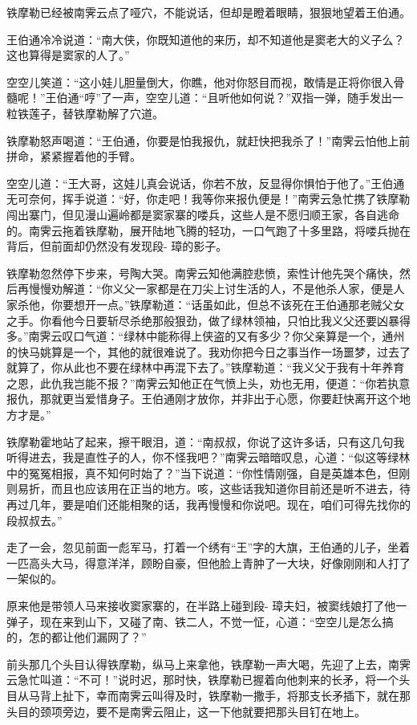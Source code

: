 \documentclass[12pt,oneside]{book}
\begin{document}
铁摩勒已经被南霁云点了哑穴，不能说话，但却是瞪着眼睛，狠狠地望着王伯通。

王伯通冷冷说道：``南大侠，你既知道他的来历，却不知道他是窦老大的义子么？这也算得是窦家的人了。''

空空儿笑道：``这小娃儿胆量倒大，你瞧，他对你怒目而视，敢情是正将你很入骨髓呢！''王伯通``哼''了一声，空空儿道：``且听他如何说？''双指一弹，随手发出一粒铁莲子，替铁摩勒解了穴道。

铁摩勒怒声喝道：``王伯通，你要是怕我报仇，就赶快把我杀了！''南霁云怕他上前拼命，紧紧握着他的手臂。

空空儿道：``王大哥，这娃儿真会说话，你若不放，反显得你惧怕于他了。''王伯通无可奈何，挥手说道：``好，你走吧！我等你来报仇便是！''南霁云急忙携了铁摩勒闯出寨门，但见漫山遍岭都是窦家寨的喽兵，这些人是不愿归顺王家，各自逃命的。南霁云拖着铁摩勒，展开陆地飞腾的轻功，一口气跑了十多里路，将喽兵抛在背后，但前面却仍然没有发现段-
璋的影子。

铁摩勒忽然停下步来，号陶大哭。南霁云知他满腔悲愤，索性计他先哭个痛快，然后再慢慢劝解道：``你义父一家都是在刀尖上讨生活的人，不是他杀人家，便是人家杀他，你要想开一点。''铁摩勒道：``话虽如此，但总不该死在王伯通那老贼父女之手。你看他今日要斩尽杀绝那般狠劲，做了绿林领袖，只怕比我义父还要凶暴得多。''南霁云叹口气道：``绿林中能称得上侠盗的又有多少？你父亲算是一个，通州的快马姚算是一个，其他的就很难说了。我劝你把今日之事当作一场噩梦，过去了就算了，你从此也不要在绿林中再混下去了。''铁摩勒道：``我义父于我有十年养育之恩，此仇我岂能不报？''南霁云知他正在气愤上头，劝也无用，便道：``你若执意报仇，那就更当爱惜身子。王伯通刚才放你，并非出于心愿，你要赶快离开这个地方才是。''

铁摩勒霍地站了起来，擦干眼泪，道：``南叔叔，你说了这许多话，只有这几句我听得进去，我是直性子的人，你不怪我吧？''南霁云暗暗叹息，心道：``似这等绿林中的冤冤相报，真不知何时始了？''当下说道：``你性情刚强，自是英雄本色，但刚则易折，而且也应该用在正当的地方。咳，这些话我知道你目前还是听不进去，待再过几年，要是咱们还能相聚的话，我再慢慢和你说吧。现在，咱们可得先找你的段叔叔去。''

走了一会，忽见前面一彪军马，打着一个绣有``王''字的大旗，王伯通的儿子，坐着一匹高头大马，得意洋洋，顾盼自豪，但他脸上青肿了一大块，好像刚刚和人打了一架似的。

原来他是带领人马来接收窦家寨的，在半路上碰到段-
璋夫妇，被窦线娘打了他一弹子，现在来到山下，又碰了南、铁二人，不觉一怔，心道：``空空儿是怎么搞的，怎的都让他们漏网了？''

前头那几个头目认得铁摩勒，纵马上来拿他，铁摩勒一声大喝，先迎了上去，南霁云急忙叫道：``不可！''说时迟，那时快，铁摩勒已握着向他刺来的长矛，将一个头目从马背上扯下，幸而南霁云叫得及时，铁摩勒一撒手，将那支长矛插下，就在那头目的颈项旁边，要不是南霁云阻止，这一下他就要把那头目钉在地上。
\end{document}
